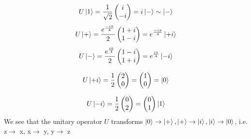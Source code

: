 \documentclass[11pt,a4paper]{article}
\begin{document}
    \begin{equation}
        U\ket{1} = \frac{1}{\sqrt{2}}
        \left(
            \begin{matrix}
                i\\-i
            \end{matrix}
            \right)
            =i\ket{-}\sim\ket{-}
        \end{equation}
\begin{equation}
    U\ket{+} = \frac{e^{\frac{-i\pi}{4}}}{2}
    \left(
        \begin{matrix}
            1+i\\1-i
        \end{matrix}
    \right)
    =e^{\frac{-i\pi}{4}}\ket{+i}
\end{equation}
\begin{equation}
    U\ket{-} = \frac{e^{\frac{i\pi}{4}}}{2}
    \left(
        \begin{matrix}
            1-i\\1+i
        \end{matrix}
    \right) 
    = e^{\frac{i\pi}{4}}\ket{-i}
\end{equation}

\begin{equation}
    U\ket{+i} = \frac{1}{2}
    \left(
        \begin{matrix}
            2\\0
        \end{matrix}
    \right)
    =
    \left(
        \begin{matrix}
            1\\0
        \end{matrix}
    \right)
    = \ket{0}
\end{equation}

\begin{equation}
    U\ket{-i} = \frac{1}{2}
    \left(
        \begin{matrix}
            0\\2
        \end{matrix}
    \right)
    =
    \left(
        \begin{matrix}
            0\\1
        \end{matrix}
    \right)
    \ket{1}
\end{equation}
We see that the unitary operator $U$ transforms $\ket{0}\rightarrow \ket{+}, \ket{+}\rightarrow\ket{i}, \ket{i}\rightarrow \ket{0}$, i.e. z$\rightarrow$ x, x$\rightarrow$ y, y$\rightarrow$ z
\end{document}

